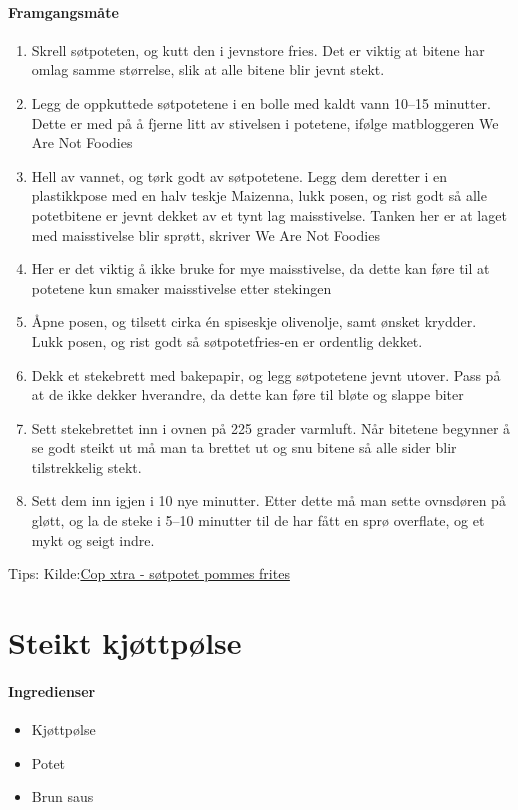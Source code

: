 \documentclass[12pt,a4paper]{book}
\begin{document}
{\paragraph{Framgangsmåte}
\begin{enumerate}[noitemsep]
	\item Skrell søtpoteten, og kutt den i jevnstore fries. Det er viktig at bitene har omlag samme størrelse, slik at alle bitene blir jevnt stekt.
	\item Legg de oppkuttede søtpotetene i en bolle med kaldt vann 10--15 minutter. Dette er med på å fjerne litt av stivelsen i potetene, ifølge matbloggeren We Are Not Foodies
	\item Hell av vannet, og tørk godt av søtpotetene. Legg dem deretter i en plastikkpose med en halv teskje Maizenna, lukk posen, og rist godt så alle potetbitene er jevnt dekket av et tynt lag maisstivelse. Tanken her er at laget med maisstivelse blir sprøtt, skriver We Are Not Foodies
	\item Her er det viktig å ikke bruke for mye maisstivelse, da dette kan føre til at potetene kun smaker maisstivelse etter stekingen
	\item Åpne posen, og tilsett cirka én spiseskje olivenolje, samt ønsket krydder. Lukk posen, og rist godt så søtpotetfries-en er ordentlig dekket.
	\item Dekk et stekebrett med bakepapir, og legg søtpotetene jevnt utover. Pass på at de ikke dekker hverandre, da dette kan føre til bløte og slappe biter
	\item Sett stekebrettet inn i ovnen på 225 grader varmluft. Når bitetene begynner å se godt steikt ut må man ta brettet ut og snu bitene så alle sider blir tilstrekkelig stekt.
	\item Sett dem inn igjen i 10 nye minutter. Etter dette må man sette ovnsdøren på gløtt, og la de steke i 5--10 minutter til de har fått en sprø overflate, og et mykt og seigt indre.

\end{enumerate}

Tips:
Kilde:\href{https://coop.no/extra/mat--trender/garantert-spro-sotpotetfries/}{Cop xtra - søtpotet pommes frites}
\clearpage{}
\clearpage{}\section{﻿Steikt kjøttpølse}


\paragraph{Ingredienser}
\begin{itemize}[noitemsep]
	\item Kjøttpølse
	\item Potet
	\item Brun saus
\end{itemize}

}
\end{document}
